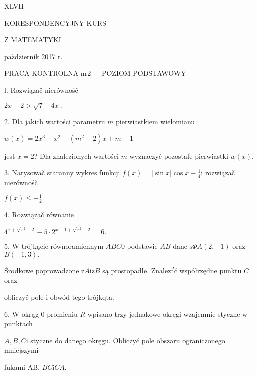 \documentclass[a4paper,12pt]{article}
\begin{document}
XLVII

KORESPONDENCYJNY KURS

Z MATEMATYKI

$\mathrm{p}\mathrm{a}\acute{\mathrm{z}}$dziernik 2017 $\mathrm{r}.$

PRACA KONTROLNA $\mathrm{n}\mathrm{r} 2-$ POZIOM PODSTAWOWY

l. Rozwiązač nierównośč

$2x-2>\sqrt{7-4x}.$

2. Dla jakich wartości parametru $m$ pierwiastkiem wielomianu

$w(x)=2x^{3}-x^{2}-(m^{2}-2)x+m-1$

jest $x=2$? Dla znalezionych wartości $m$ wyznaczyč pozostafe pierwiastki $w(x).$

3. Narysowač staranny wykres funkcji $f(x)=|\displaystyle \sin x|\cos x-\frac{1}{4}\mathrm{i}$ rozwiązač nierównośč

$f(x)\displaystyle \leq-\frac{1}{2}.$

4. Rozwiązač równanie

$4^{x+\sqrt{x^{2}-2}}-5\cdot 2^{x-1+\sqrt{x^{2}-2}}=6.$

5. $\mathrm{W}$ trójkącie równoramiennym $ABC0$ podstawie $AB$ dane $\mathrm{s}\Phi A(2,-1)$ oraz $B(-1,3).$

Środkowe poprowadzone $\mathrm{z}A\mathrm{i}\mathrm{z}B$ są prostopadłe. $\mathrm{Z}\mathrm{n}\mathrm{a}\mathrm{l}\mathrm{e}\mathrm{z}^{J}\text{č}$ współrzędne punktu $C$ oraz

obliczyč pole $\mathrm{i}$ obwód tego trójkqta.

6. $\mathrm{W}$ okrąg $0$ promieniu $R$ wpisano trzy jednakowe okręgi wzajemnie styczne $\mathrm{w}$ punktach

$A, B, C\mathrm{i}$ styczne do danego okręgu. Obliczyč pole obszaru ograniczonego mniejszymi

fukami AB, $BC\mathrm{i}CA.$
\end{document}
